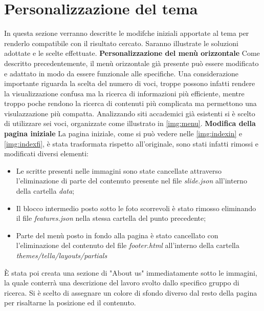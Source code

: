 \documentclass[target=bach,aauheader=]{thud}
\begin{document}
\section{Personalizzazione del tema}
In questa sezione verranno descritte le modifche iniziali apportate al tema per renderlo compatibile con il risultato cercato. Saranno illustrate le soluzioni adottate e le scelte effettuate. 
\newline \newline
\textbf{{\fontsize{12}{14}\selectfont Personalizzazione del menù orizzontale}}
\newline \newline
Come descritto precedentemente, il menù orizzontale già presente può essere modificato e adattato in modo da essere funzionale alle specifiche. 
Una considerazione importante riguarda la scelta del numero di voci, troppe possono infatti rendere la visualizzazione confusa ma la ricerca di informazioni più efficiente, mentre troppo poche rendono la ricerca di contenuti più complicata ma permettono una visulazzazione più compatta. 
Analizzando siti accademici già esistenti si è scelto di utilizzare sei voci, organizzate come illustrato in \cref{img:menu}.
\newline \newline
\textbf{{\fontsize{12}{14}\selectfont Modifica della pagina iniziale}}
\newline \newline
La pagina iniziale, come si può vedere nelle \cref{img:indexin} e \cref{img:indexfi}, è stata trasformata rispetto all'originale, sono stati infatti rimossi e modificati diversi elementi: 
\begin{itemize}
    \item Le scritte presenti nelle immagini sono state cancellate attraverso l'eliminazione di parte del contenuto presente nel file \textit{slide.json} all'interno della cartella \textit{data};
    \item Il blocco intermedio posto sotto le foto scorrevoli è stato rimosso eliminando il file \textit{features.json} nella stessa cartella del punto precedente; 
    \item Parte del menù posto in fondo alla pagina è stato cancellato con l'eliminazione del contenuto del file \textit{footer.html} all'interno della cartella \textit{themes/tella/layouts/partials}
\end{itemize}
È stata poi creata una sezione di "About us" immediatamente sotto le immagini, la quale conterrà una descrizione del lavoro svolto dallo specifico gruppo di ricerca. Si è scelto di assegnare un colore di sfondo diverso dal resto della pagina per risaltarne la posizione ed il contenuto.
\end{document}
